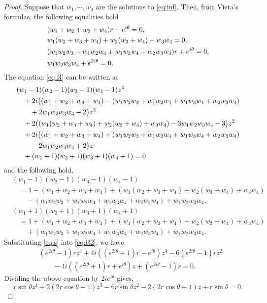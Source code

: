 \documentclass[10pt,a4paper]{amsart}
\begin{document}
\begin{proof}
Suppose that $ w_1,\cdots,w_4 $ are the solutions to \eqref{eq:inf}.
Then, from Vieta's formulas, the following equalities hold
\begin{align} \notag
  &  (w_1+w_2+w_3+w_4)r-e^{i\theta}=0,\\  \notag
  &  w_1(w_2+w_3+w_4)+w_2(w_3+w_4)+w_3w_4=0, \\ \notag
  &  (w_1w_2w_3+w_1w_2w_4+w_1w_3w_4+w_2w_3w_4)r+e^{i\theta}=0, \\ \label{eq:s}
  & w_1w_2w_3w_4+e^{2i\theta}=0.
\end{align}
The equation \eqref{eq:R} can be written as 
\begin{align}\notag
  &(w_1-1)(w_2-1)(w_3-1)(w_4-1)z^4 \\ \notag
  & \quad +2i\big((w_1+w_2+w_3+w_4)-(w_1w_2w_3+w_1w_2w_4+w_1w_3w_4+w_2w_3w_4)\\
     \notag
  & \qquad
        +2w_1w_2w_3w_4-2\big)z^3 \\ \notag
  & \quad +2\big((w_1(w_2+w_3+w_4)+w_2(w_3+w_4)+w_3w_4)-3w_1w_2w_3w_4-3\big)z^2 \\
       \notag
  & \quad +2i\big((w_1+w_2+w_3+w_4)+(w_1w_2w_3+w_1w_2w_4+w_1w_3w_4+w_2w_3w_4)\\
    \notag
  & \qquad
           -2w_1w_2w_3w_4+2\big)z \\  \label{eq:R2}
  & \quad +(w_1+1)(w_2+1)(w_3+1)(w_4+1)=0
\end{align}
and the following hold,
\begin{align*}
 & (w_1-1)(w_2-1)(w_3-1)(w_4-1) \\
 & \quad =1-(w_1+w_2+w_3+w_4)
    +(w_1(w_2+w_3+w_4)+w_2(w_3+w_4)+w_3w_4) \\
 & \qquad   -(w_1w_2w_3+w_1w_2w_4+w_1w_3w_4+w_2w_3w_4)+w_1w_2w_3w_4, \\
 & (w_1+1)(w_2+1)(w_3+1)(w_4+1) \\ 
 & \quad  =1+(w_1+w_2+w_3+w_4)
      +(w_1(w_2+w_3+w_4)+w_2(w_3+w_4)+w_3w_4) \\
 & \qquad   +(w_1w_2w_3+w_1w_2w_4+w_1w_3w_4+w_2w_3w_4)+w_1w_2w_3w_4.
\end{align*}
Substituting \eqref{eq:s} into \eqref{eq:R2}, we have
\begin{align*}
  & (e^{2i\theta}-1)rz^4+4i((e^{2i\theta}+1)r-e^{i\theta})z^3-6(e^{2i\theta}-1)rz^2 \\
  & \qquad
     -4i((e^{2i\theta}+1)r+e^{i\theta})z +(e^{2i\theta}-1)r=0.
\end{align*}
Dividing the above equation by $ 2ie^{i\theta} $ gives,
\begin{equation}\label{eq:R3}
  r\sin \theta z^4+2(2r\cos \theta -1)z^3-6r\sin \theta z^2
    -2(2r\cos\theta -1)z+r\sin\theta =0.
\end{equation}


\end{proof}
\end{document}
